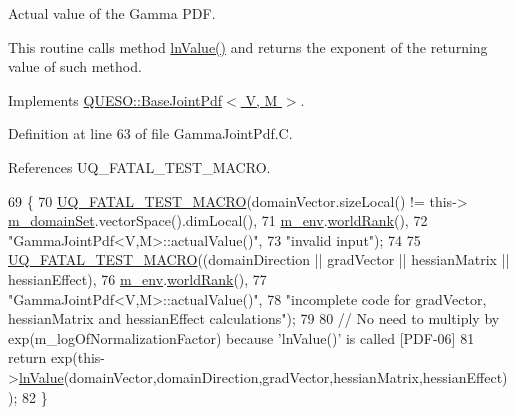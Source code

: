 Actual value of the Gamma P\-D\-F. 

This routine calls method \hyperlink{class_q_u_e_s_o_1_1_gamma_joint_pdf_a990337e7c25a4214b15fd71cb6deb384}{ln\-Value()} and returns the exponent of the returning value of such method. 

Implements \hyperlink{class_q_u_e_s_o_1_1_base_joint_pdf_a3c367a0cc3fb707a136c5df47dd414c1}{Q\-U\-E\-S\-O\-::\-Base\-Joint\-Pdf$<$ V, M $>$}.



Definition at line 63 of file Gamma\-Joint\-Pdf.\-C.



References U\-Q\-\_\-\-F\-A\-T\-A\-L\-\_\-\-T\-E\-S\-T\-\_\-\-M\-A\-C\-R\-O.


\begin{DoxyCode}
69 \{
70   \hyperlink{_defines_8h_a56d63d18d0a6d45757de47fcc06f574d}{UQ\_FATAL\_TEST\_MACRO}(domainVector.sizeLocal() != this->
      \hyperlink{class_q_u_e_s_o_1_1_base_scalar_function_a67696e86211197938c72cd11863f5cf8}{m\_domainSet}.vectorSpace().dimLocal(),
71                       \hyperlink{class_q_u_e_s_o_1_1_base_scalar_function_adf44141aeb765d97613286f88f235f04}{m\_env}.\hyperlink{class_q_u_e_s_o_1_1_base_environment_a78b57112bbd0e6dd0e8afec00b40ffa7}{worldRank}(),
72                       \textcolor{stringliteral}{"GammaJointPdf<V,M>::actualValue()"},
73                       \textcolor{stringliteral}{"invalid input"});
74 
75   \hyperlink{_defines_8h_a56d63d18d0a6d45757de47fcc06f574d}{UQ\_FATAL\_TEST\_MACRO}((domainDirection || gradVector || hessianMatrix || hessianEffect),
76                       \hyperlink{class_q_u_e_s_o_1_1_base_scalar_function_adf44141aeb765d97613286f88f235f04}{m\_env}.\hyperlink{class_q_u_e_s_o_1_1_base_environment_a78b57112bbd0e6dd0e8afec00b40ffa7}{worldRank}(),
77                       \textcolor{stringliteral}{"GammaJointPdf<V,M>::actualValue()"},
78                       \textcolor{stringliteral}{"incomplete code for gradVector, hessianMatrix and hessianEffect calculations"});
79 
80   \textcolor{comment}{// No need to multiply by exp(m\_logOfNormalizationFactor) because 'lnValue()' is called [PDF-06]}
81   \textcolor{keywordflow}{return} exp(this->\hyperlink{class_q_u_e_s_o_1_1_gamma_joint_pdf_a990337e7c25a4214b15fd71cb6deb384}{lnValue}(domainVector,domainDirection,gradVector,hessianMatrix,hessianEffect));
82 \}
\end{DoxyCode}
